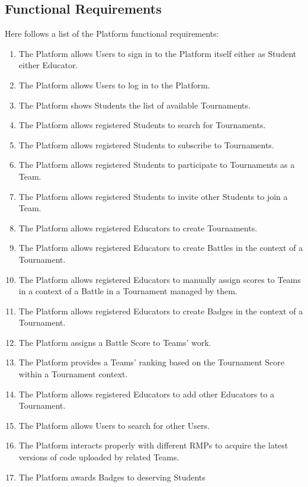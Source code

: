 \newpage

\subsection{Functional Requirements}
Here follows a list of the Platform functional requirements:
\begin{enumerate}[label= \textbf{R\arabic*}]
    \item The Platform allows Users to sign in to the Platform itself either as Student either Educator.\label{req:reqSignin}
    \item The Platform allows Users to log in to the Platform. \label{req:reqLogin}
    \item The Platform shows Students the list of available Tournaments. \label{req:reqShowTournaments}
    \item The Platform allows registered Students to search for Tournaments. \label{req:reqSearchForTournament}
    \item The Platform allows registered Students to subscribe to Tournaments. \label{req:reqTournamentSubscription}
    \item The Platform allows registered Students to participate to Tournaments as a Team. \label{req:reqCreateTeam}
    \item The Platform allows registered Students to invite other Students to join a Team. \label{req:reqJoinTeam}
    \item The Platform allows registered Educators to create Tournaments. \label{req:reqCreateTournaments}
    \item The Platform allows registered Educators to create Battles in the context of a Tournament. \label{req:reqCreateBattle}
    \item The Platform allows registered Educators to manually assign scores to Teams in a context of a Battle in a Tournament managed by them. \label{req:reqManualEvalCode} 
    \item The Platform allows registered Educators to create Badges in the context of a Tournament. \label{req:reqCreateBadge}
    \item The Platform assigns a Battle Score to Teams' work. \label{req:reqEvaluateCode}
    \item The Platform provides a Teams' ranking based on the Tournament Score within a Tournament context. \label{req:reqRankingsUpdate}
    \item The Platform allows registered Educators to add other Educators to a Tournament. \label{req:reqJoinManagement}
    \item The Platform allows Users to search for other Users. \label{req:reqSearchForUsers}
    \item The Platform interacts properly with different RMPs to acquire the latest versions of code uploaded by related Teams. \label{req:reqPullRMP}
    \item The Platform awards Badges to deserving Students \label{req:reqAssignBadge}
\end{enumerate}

